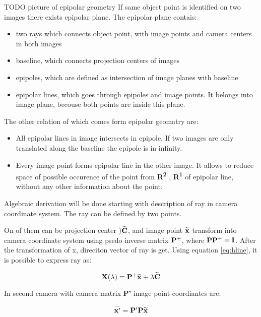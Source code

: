 \documentclass[a4paper,12pt]{report}
\newcommand{\ematr}[1]{
{\bf #1}
}
\newcommand{\ehvect}[1]{
{\bf \widetilde{#1}}
}
\newcommand{\escal}[1]{
{\it #1}
}
\newcommand{\eucl}[1]{
{\bf R\textsuperscript{#1}}
}
\begin{document}
TODO picture of epipolar geometry
If same object point is identified on two images there exists epipolar plane.
The epipolar plane contais:

\begin{itemize}
\item two rays which connects object point, with image points and camera centers in both images
\item baseline, which connects projection centers of images
\item epipoles, which are defined as intersection of image planes with baseline
\item epipolar lines, which goes through epipoles and image points. It belongs into image plane, 
      becouse both points are inside this plane.  
\end{itemize}


The other relation of which comes form epipolar geomatry are:

\begin{itemize}
\item All epipolar lines in image intersects in epipole. If two images are only translated along the baseline 
     the epipole is in infinity.
\item Every image point forms epipolar line in the other image. It allows to reduce space of possible occurence of the point 
      from \eucl{2}, \eucl{1} of epipolar line, without any other information about the point. 

\end{itemize}

Algebraic derivation will be done starting with description of ray in camera coordinate system.
The ray can be defined by two points.

On of them can be projection center )$\ehvect{C}$, and 
image point $\ehvect{x}$ transform into camera coordinate system using psedo inverse matrix $\ematr{P}^{+}$, 
where $\ematr{P}\ematr{P}^{+} = \ematr{I}$. After the transformation of x, direciton vector of ray is get.
Using equation \eqref{eq:hline}, it is possible to express ray as:

\begin{equation}
\ematr{X}(\escal{\lambda}) = \ematr{P}^{+}\ehvect{x} + \escal{\lambda}\ehvect{C}
\end{equation}

In second camera with camera matrix \ematr{P'} image point coordiantes are:

\begin{equation}
\ehvect{x'} =  \ematr{P'}\ematr{P}\ehvect{x}
\end{equation}
\end{document}
